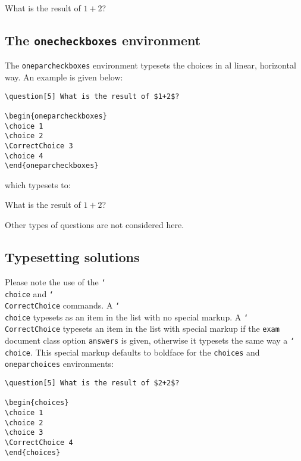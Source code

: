 \documentclass[12pt,a4paper]{exam}
\providecommand{\texorpdfstring}[2]{#1}
\newcommand{\bs}{\texorpdfstring{\char`\\}{}}
\begin{document}
\begin{questions}
\setcounter{question}{2}
\question[5] What is the result of $1+2$?

\begin{checkboxes}
\end{checkboxes}
\end{questions}

\subsection{The \texttt{onecheckboxes} environment}

The \texttt{oneparcheckboxes} environment typesets the choices
in al linear, horizontal way. An example is given below:

\begin{lstlisting}
\question[5] What is the result of $1+2$?

\begin{oneparcheckboxes}
\choice 1
\choice 2
\CorrectChoice 3
\choice 4
\end{oneparcheckboxes}
\end{lstlisting}

which typesets to:

\begin{questions}
\setcounter{question}{3}
\question[5] What is the result of $1+2$?

\begin{oneparcheckboxes}
\end{oneparcheckboxes}
\end{questions}

Other types of questions are not considered here.

\subsection{Typesetting solutions}
\label{sec:solutions}
Please note the use of the \texttt{\bs choice} and \texttt{\bs CorrectChoice}
commands. A \texttt{\bs choice} typesets as an item in the list with no special markup.
A \texttt{\bs CorrectChoice} typesets an item in the list with special markup if
the \texttt{exam} document class option \texttt{answers} is given, otherwise it
typesets the same way a \texttt{\bs choice}. This special
markup defaults to boldface for the \texttt{choices} and \texttt{oneparchoices}
environments:

\begin{lstlisting}
\question[5] What is the result of $2+2$?

\begin{choices}
\choice 1
\choice 2
\choice 3
\CorrectChoice 4
\end{choices}
\end{lstlisting}
\end{document}
